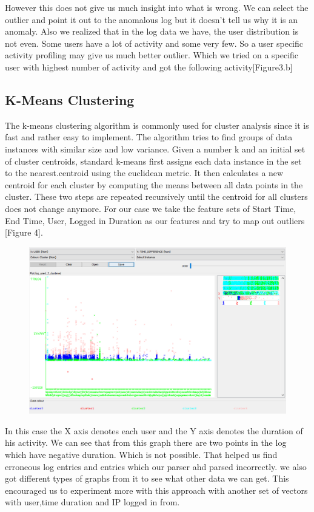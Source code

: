 \documentclass [11pt]{article}
\begin{document}
However this does not give us much insight into what is wrong. We can select the outlier and point it out to the anomalous log but it doesn't tell us why it is an anomaly. Also we realized that in the log data we have, the user distribution is not even. Some users have a lot of activity and some very few. So a user specific activity profiling may give us much better outlier. Which we tried on a specific user with highest number of activity and got the following activity[Figure3.b]

\subsection{K-Means Clustering}
The k-means clustering algorithm is commonly used for cluster analysis since it is fast and rather easy to implement. The algorithm tries to find groups of data instances with similar size and low variance. Given a number k and an initial set of cluster centroids, standard k-means first assigns each data instance in the set to the nearest.centroid using the euclidean metric. It then calculates a new centroid for each cluster by computing the means between all data points in the cluster. These two steps are repeated recursively until the centroid for all clusters does not change anymore. For our case\cite{KMean} we take the feature sets of Start Time, End Time, User, Logged in Duration as our features and try to map out outliers [Figure 4].
\begin{figure}
\centering
\includegraphics[totalheight=0.25\textheight]{./figures/userVSdur.PNG}
\caption{}
\end{figure}
In this case the X axis denotes each user and the Y axis denotes the duration of his activity. We can see that from this graph there are two points in the log which have negative duration. Which is not possible. That helped us find erroneous log entries and entries which our parser ahd parsed incorrectly. we also got different types of graphs from it to see what other data we can get. This encouraged us to experiment more with this approach with another set of vectors with user,time duration and IP logged in from.
\end{document}
